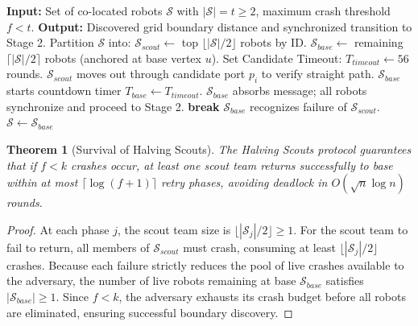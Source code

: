 \documentclass[11pt,a4paper]{report}
\newtheorem{theorem}{Theorem}[chapter]
\begin{document}
\begin{algorithm}[htbp]
\caption{Fault-Tolerant Halving Scouts Protocol (Stage 1)}
\label{alg:halving_scouts}
\begin{algorithmic}[1]
\State \textbf{Input:} Set of co-located robots $\mathcal{S}$ with $|\mathcal{S}| = t \ge 2$, maximum crash threshold $f < t$.
\State \textbf{Output:} Discovered grid boundary distance and synchronized transition to Stage 2.
    \State Partition $\mathcal{S}$ into:
    \State \quad $\mathcal{S}_{scout} \gets$ top $\lfloor |\mathcal{S}|/2 \rfloor$ robots by ID.
    \State \quad $\mathcal{S}_{base} \gets$ remaining $\lceil |\mathcal{S}|/2 \rceil$ robots (anchored at base vertex $u$).
    \State Set Candidate Timeout: $T_{timeout} \gets 56$ rounds.
    \State $\mathcal{S}_{scout}$ moves out through candidate port $p_i$ to verify straight path.
    \State $\mathcal{S}_{base}$ starts countdown timer $T_{base} \gets T_{timeout}$.
        \State $\mathcal{S}_{base}$ absorbs message; all robots synchronize and proceed to Stage 2.
        \State \textbf{break}
    \Else {}
        \State $\mathcal{S}_{base}$ recognizes failure of $\mathcal{S}_{scout}$.
        \State $\mathcal{S} \gets \mathcal{S}_{base}$ 
    \EndIf
\EndWhile
\end{algorithmic}
\end{algorithm}

\begin{theorem}[Survival of Halving Scouts]
    The Halving Scouts protocol guarantees that if $f < k$ crashes occur, at least one scout team returns successfully to base within at most $\lceil \log(f + 1) \rceil$ retry phases, avoiding deadlock in $O(\sqrt{n} \log n)$ rounds.
\end{theorem}

\begin{proof}
    At each phase $j$, the scout team size is $\lfloor |\mathcal{S}_j|/2 \rfloor \ge 1$. For the scout team to fail to return, all members of $\mathcal{S}_{scout}$ must crash, consuming at least $\lfloor |\mathcal{S}_j|/2 \rfloor$ crashes. Because each failure strictly reduces the pool of live crashes available to the adversary, the number of live robots remaining at base $\mathcal{S}_{base}$ satisfies $|\mathcal{S}_{base}| \ge 1$. Since $f < k$, the adversary exhausts its crash budget before all robots are eliminated, ensuring successful boundary discovery.
\end{proof}
\end{document}

